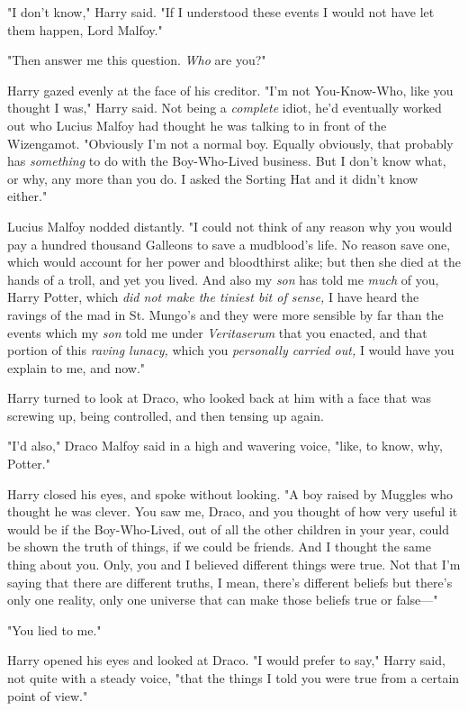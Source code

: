 "I don't know," Harry said. "If I understood these events I would not have let
them happen, Lord Malfoy."

"Then answer me this question. \emph{Who} are you?"

Harry gazed evenly at the face of his creditor. "I'm not You-Know-Who, like you
thought I was," Harry said. Not being a \emph{complete} idiot, he'd eventually
worked out who Lucius Malfoy had thought he was talking to in front of the
Wizengamot. "Obviously I'm not a normal boy. Equally obviously, that probably
has \emph{something} to do with the Boy-Who-Lived business. But I don't know
what, or why, any more than you do. I asked the Sorting Hat and it didn't know
either."

Lucius Malfoy nodded distantly. "I could not think of any reason why you would
pay a hundred thousand Galleons to save a mudblood's life. No reason save one,
which would account for her power and bloodthirst alike; but then she died at
the hands of a troll, and yet you lived. And also my \emph{son} has told me
\emph{much} of you, Harry Potter, which \emph{did not make the tiniest bit of
sense,} I have heard the ravings of the mad in St. Mungo's and they were more
sensible by far than the events which my \emph{son} told me under
\emph{Veritaserum} that you enacted, and that portion of this \emph{raving
lunacy,} which you \emph{personally carried out,} I would have you explain to
me, and now."

Harry turned to look at Draco, who looked back at him with a face that was
screwing up, being controlled, and then tensing up again.

"I'd also," Draco Malfoy said in a high and wavering voice, "like, to know,
why, Potter."

Harry closed his eyes, and spoke without looking. "A boy raised by Muggles who
thought he was clever. You saw me, Draco, and you thought of how very useful it
would be if the Boy-Who-Lived, out of all the other children in your year,
could be shown the truth of things, if we could be friends. And I thought the
same thing about you. Only, you and I believed different things were true. Not
that I'm saying that there are different truths, I mean, there's different
beliefs but there's only one reality, only one universe that can make those
beliefs true or false---"

"You lied to me."

Harry opened his eyes and looked at Draco. "I would prefer to say," Harry said,
not quite with a steady voice, "that the things I told you were true from a
certain point of view."

